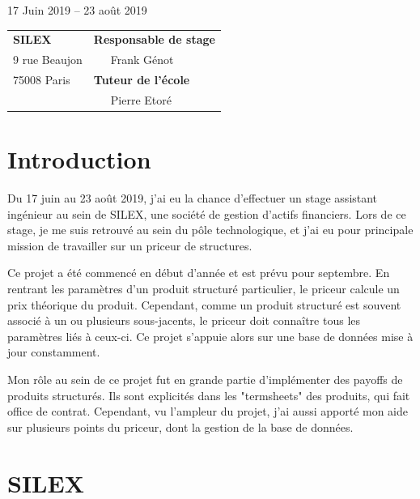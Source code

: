 \documentclass[11pt,a4paper]{article}
\begin{document}
\begin{center}
\vspace{3mm}
17 Juin 2019 -- 23 août 2019\\
\vspace{4cm}
\begin{tabular}{p{10cm}p{10cm}}
{\bf SILEX}                                             &{\bf Responsable de stage}\\
{ 9 rue Beaujon}                           & ~~~Frank Génot\\
{ 75008 Paris}                             & {\bf Tuteur de l'école}\\
                                                        & ~~~Pierre Etoré\\
\end{tabular}
\end{center}
\newpage
\tableofcontents
\newpage
\section{Introduction}
Du 17 juin au 23 août 2019, j'ai eu la chance d'effectuer un stage assistant ingénieur au sein de SILEX, une société de gestion d'actifs financiers. Lors de ce stage, je me suis retrouvé au sein du pôle technologique, et j'ai eu pour principale mission de travailler sur un priceur de \glspl{structure}. \vspace{0.5em}

Ce projet a été commencé en début d'année et est prévu pour septembre. En rentrant les paramètres d'un produit structuré particulier, le priceur calcule un prix théorique du produit. Cependant, comme un produit structuré est souvent associé à un ou plusieurs \glspl{sous-jacent}, le priceur doit connaître tous les paramètres liés à ceux-ci. Ce projet s'appuie alors sur une base de données mise à jour constamment. \vspace{0.5em}

Mon rôle au sein de ce projet fut en grande partie d'implémenter des \glspl{payoff} de produits structurés. Ils sont explicités dans les "termsheets" des produits, qui fait office de contrat. Cependant, vu l'ampleur du projet, j'ai aussi apporté mon aide sur plusieurs points du priceur, dont la gestion de la base de données. \vspace{0.5em}




\newpage
\section{SILEX}
\end{document}
